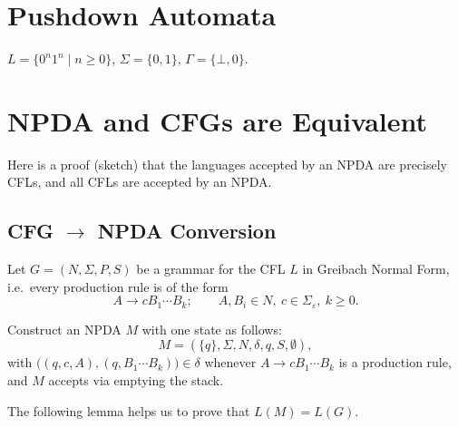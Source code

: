 \section{Pushdown Automata}

\begin{example}
$L = \{0^n1^n \mid n \geq 0\}$, $\Sigma = \{0,1\}$, $\Gamma = \{\bot, 0\}$.

\begin{center}
\end{center}
\end{example}

\section{NPDA and CFGs are Equivalent}

Here is a proof (sketch) that the languages accepted by an NPDA are precisely CFLs, and all CFLs are accepted by an NPDA.

\subsection*{CFG $\to$ NPDA Conversion}

Let $G = (N, \Sigma, P, S)$ be a grammar for the CFL $L$ in Greibach Normal Form, i.e.\ every production rule is of the form
\[
A \to cB_1 \cdots B_k; \qquad A, B_i \in N,\ c \in \Sigma_\varepsilon,\ k \geq 0.
\]

Construct an NPDA $M$ with one state as follows:
\[
M = (\{q\}, \Sigma, N, \delta, q, S, \emptyset),
\]
with $\big((q,c,A), (q,B_1 \cdots B_k)\big) \in \delta$ whenever $A \to cB_1 \cdots B_k$ is a production rule, and $M$ accepts via emptying the stack.

The following lemma helps us to prove that $L(M) = L(G)$.

